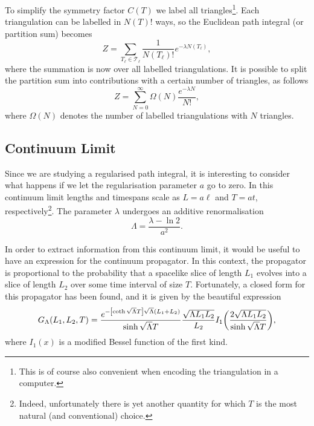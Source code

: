 To simplify the symmetry factor $C(T)$ we label all triangles\footnote{This is of course also convenient when encoding the triangulation in a computer.}. Each triangulation can be labelled in $N(T)!$ ways, so the Euclidean path integral (or partition sum) becomes
\begin{equation}
    Z
    =
    \sum_{T_\ell \in \mathcal{T}_\ell} \frac{1}{N(T_\ell)!} e^{- \lambda N(T_\ell)}
    ,
\end{equation}
where the summation is now over all labelled triangulations. It is possible to split the partition sum into contributions with a certain number of triangles, as follows
\begin{equation}\label{eq:part_sum}
    Z
    =
    \sum_{N = 0}^\infty \Omega(N) \frac{e^{- \lambda N}}{N!}
    ,
\end{equation}
where $\Omega(N)$ denotes the number of labelled triangulations with $N$ triangles.

\subsection{Continuum Limit}

Since we are studying a regularised path integral, it is interesting to consider what happens if we let the regularisation parameter $a$ go to zero. In this continuum limit lengths and timespans scale as $L = a \ell$ and $T = a t$, respectively\footnote{Indeed, unfortunately there is yet another quantity for which $T$ is the most natural (and conventional) choice.}. The parameter $\lambda$ undergoes an additive renormalisation
\begin{equation}
    \Lambda = \frac{\lambda - \ln 2}{a^2}
    .
\end{equation}

In order to extract information from this continuum limit, it would be useful to have an expression for the continuum propagator. In this context, the propagator is proportional to the probability that a spacelike slice of length $L_1$ evolves into a slice of length $L_2$ over some time interval of size $T$. Fortunately, a closed form for this propagator has been found, and it is given by the beautiful expression \cite{1998}
\begin{equation}
    G_\Lambda(L_1, L_2, T)
    =
    \frac{
        e^{-\qty[\coth \sqrt{\Lambda} T] \sqrt{\Lambda} (L_1 + L_2)}
    }{
        \sinh \sqrt{\Lambda} T
    }
    \frac{\sqrt{\Lambda L_1 L_2}}{L_2}
    I_1 \qty(\frac{2 \sqrt{\Lambda L_1 L_2}}{\sinh \sqrt{\Lambda} T})
    ,
\end{equation}
where $I_1(x)$ is a modified Bessel function of the first kind.

